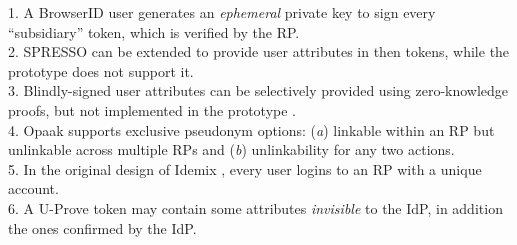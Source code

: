 \begin{table}[tb]
{\footnotesize
1. A BrowserID user generates an \emph{ephemeral} private key to sign every ``subsidiary'' token,
 which is verified by the RP.\\
2. SPRESSO can be extended to provide user attributes in then tokens, while the prototype does not support it.\\
3. Blindly-signed user attributes can be selectively provided using zero-knowledge proofs,
    but not implemented in the prototype \cite{PseudoID}.\\
4. Opaak supports exclusive pseudonym options: (\emph{a}) linkable within an RP but unlinkable across multiple RPs and (\emph{b}) unlinkability for any two actions.\\
5. In the original design of Idemix \cite{idemix}, every user logins to an RP with a unique account.\\
6. A U-Prove token may contain some attributes \emph{invisible} to the IdP, in addition the ones confirmed by the IdP.}
\end{table}



